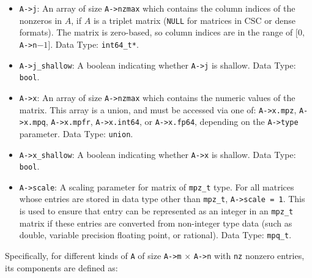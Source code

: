 \documentclass[12pt]{report}
\theoremstyle{definition}
\begin{document}
\begin{itemize}
\item \verb|A->j|: An array of size \verb|A->nzmax| which contains the column
indices of the nonzeros in $A$, if $A$ is a triplet matrix (\verb|NULL| for
matrices in CSC or dense formats).
The matrix is zero-based, so column indices are
in the range of $[0,$ \verb|A->n|$-1]$. Data Type: \verb|int64_t*|.

\item \verb|A->j_shallow|: A boolean indicating whether \verb|A->j| is shallow.
Data Type: \verb|bool|.

\item \verb|A->x|: An array of size \verb|A->nzmax| which contains the
numeric values of the matrix.  This array is a union, and must be accessed via
one of: \verb|A->x.mpz|, \verb|A->x.mpq|, \verb|A->x.mpfr|, \verb|A->x.int64|,
or \verb|A->x.fp64|, depending on the \verb|A->type| parameter.
Data Type: \verb|union|.

\item \verb|A->x_shallow|: A boolean indicating whether \verb|A->x| is
shallow. Data Type: \verb|bool|.

\item \verb|A->scale|: A scaling parameter for matrix of \verb|mpz_t| type. For
all matrices whose entries are stored in data type other than \verb|mpz_t|,
\verb|A->scale = 1|. This is used to ensure that entry can be represented as an
integer in an \verb|mpz_t| matrix if these entries are converted from non-integer type
data (such as double, variable precision floating point, or rational). Data
Type: \verb|mpq_t|.

\end{itemize}

Specifically, for different kinds of \verb|A| of size \verb|A->m| $\times$ \verb|A->n|
with \verb|nz| nonzero entries, its components are defined as:
\end{document}
